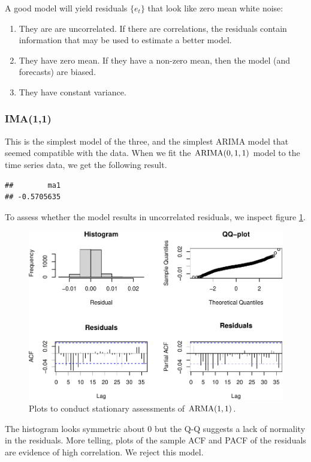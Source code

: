 \documentclass[final,
  11pt,
]{article}
\begin{document}
A good model will yield residuals \(\{e_t\}\) that look like zero mean
white noise:
\begin{enumerate}
\item They are are uncorrelated.
If there are correlations, the residuals contain information that may be used to
estimate a better model.
\item They have zero mean.
If they  have a non-zero mean, then the model (and forecasts) are biased.
\item They have constant variance.
\end{enumerate}

\hypertarget{ima11}{%
\subsubsection{IMA(1,1)}\label{ima11}}

This is the simplest model of the three, and the simplest ARIMA model
that seemed compatible with the data. When we fit the \(\operatorname{ARIMA}(0,1,1)\)
model to the time series data, we get the following result.

\begin{verbatim}
##        ma1 
## -0.5705635
\end{verbatim}

To assess whether the model results in uncorrelated residuals, we
inspect figure \ref{fig:resv}.

\begin{figure}
\includegraphics{paper_files/figure-latex/unnamed-chunk-9-1.pdf}
\caption{Plots to conduct stationary assessments of $\operatorname{ARMA}(1,1)$.}
\label{fig:resv}
\end{figure}

The histogram looks symmetric about \(0\) but the Q-Q suggests a lack of
normality in the residuals. More telling, plots of the sample ACF and
PACF of the residuals are evidence of high correlation. We reject this
model.
\end{document}

